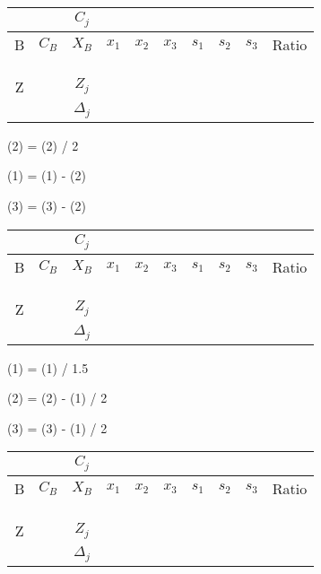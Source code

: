 \documentclass{exam}
\begin{document}


\begin{tabular}{cccccccccc}
    \toprule
    &  & $C_j$ &  &  &  &  &  &  &  \\
    \midrule
    B & $C_B$ & $X_B$ & $x_1$ & $x_2$ & $x_3$ & $s_1$ & $s_2$ & $s_3$ & Ratio \\
    \midrule
    &  &  &  &  &  &  &  &  &  \\
    &  &  &  &  &  &  &  &  &  \\
    &  &  &  &  &  &  &  &  &  \\
    \midrule
    Z & & $Z_j$ &  & & &  &  &  & \\
    & & $\Delta_j$ &  & & &  &  &  & \\
    \bottomrule
\end{tabular}

(2) = (2) / 2

(1) = (1) - (2) 

(3) = (3) - (2)

\begin{tabular}{cccccccccc}
    \toprule
     &  & $C_j$ &  &  &  &  &  &  &  \\
    \midrule
    B & $C_B$ & $X_B$ & $x_1$ & $x_2$ & $x_3$ & $s_1$ & $s_2$ & $s_3$ & Ratio \\
    \midrule
     &  &  &  &  &  &  &  &  &  \\
     &  &  &  &  &  &  &  &  &  \\
     &  &  &  &  &  &  &  &  &  \\
    \midrule
    Z & & $Z_j$ &  & & &  &  &  & \\
    & & $\Delta_j$ &  & & &  &  &  & \\
    \bottomrule
\end{tabular}


(1) = (1) / 1.5

(2) = (2) - (1) / 2 

(3) = (3) - (1) / 2

\begin{tabular}{cccccccccc}
    \toprule
        &  & $C_j$ &  &  &  &  &  &  &  \\
    \midrule
    B & $C_B$ & $X_B$ & $x_1$ & $x_2$ & $x_3$ & $s_1$ & $s_2$ & $s_3$ & Ratio \\
    \midrule
        &  &  &  &  &  &  &  &  &  \\
        &  &  &  &  &  &  &  &  &  \\
        &  &  &  &  &  &  &  &  &  \\
    \midrule
    Z & & $Z_j$ &  & & &  &  &  & \\
    & & $\Delta_j$ &  & & &  &  &  & \\
    \bottomrule
\end{tabular}
\end{document}
